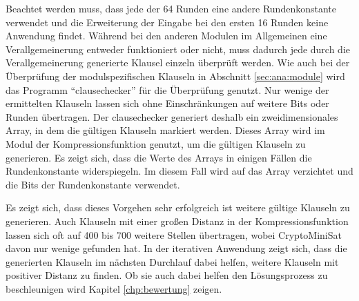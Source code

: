 Beachtet werden muss, dass jede der 64 Runden eine andere Rundenkonstante verwendet und die Erweiterung der Eingabe bei den ersten 16 Runden keine
Anwendung findet. Während bei den anderen Modulen im Allgemeinen eine Verallgemeinerung entweder funktioniert oder nicht, muss dadurch jede durch die
Verallgemeinerung generierte Klausel einzeln überprüft werden. Wie auch bei der Überprüfung der modulspezifischen Klauseln in Abschnitt \ref{sec:ana:module}
wird das Programm "`clausechecker"' für die Überprüfung genutzt. Nur wenige der ermittelten Klauseln lassen sich ohne Einschränkungen auf weitere Bits oder
Runden übertragen. Der clausechecker generiert deshalb ein zweidimensionales Array, in dem die gültigen Klauseln markiert werden. Dieses Array wird im
Modul der Kompressionsfunktion genutzt, um die gültigen Klauseln zu generieren. Es zeigt sich, dass die Werte des Arrays in einigen Fällen die Rundenkonstante
widerspiegeln. Im diesem Fall wird auf das Array verzichtet und die Bits der Rundenkonstante verwendet.

Es zeigt sich, dass dieses Vorgehen sehr erfolgreich ist weitere gültige Klauseln zu generieren. Auch Klauseln mit einer großen Distanz in der Kompressionsfunktion
lassen sich oft auf 400 bis 700 weitere Stellen übertragen, wobei CryptoMiniSat davon nur wenige gefunden hat. In der iterativen Anwendung zeigt sich, dass die
generierten Klauseln im nächsten Durchlauf dabei helfen, weitere Klauseln mit positiver Distanz zu finden. Ob sie auch dabei helfen den Lösungsprozess zu beschleunigen
wird Kapitel \ref{chp:bewertung} zeigen.